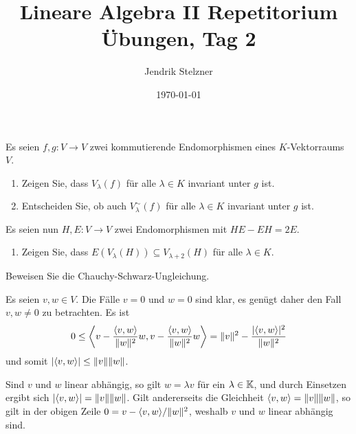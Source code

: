 \documentclass[a4paper, 10pt]{scrartcl}
\title{Lineare Algebra II Repetitorium \\ Übungen, Tag 2}
\author{Jendrik Stelzner}
\date{\today}
\begin{document}
\maketitle


\begin{question}
  Es seien $f, g \colon V \to V$ zwei kommutierende Endomorphismen eines $K$-Vektorraums $V$.
  \begin{enumerate}[leftmargin=*]
    \item
      Zeigen Sie, dass $V_\lambda(f)$ für alle $\lambda \in K$ invariant unter $g$ ist.
    \item
      Entscheiden Sie, ob auch $V^\sim_\lambda(f)$ für alle $\lambda \in K$ invariant unter $g$ ist.
  \end{enumerate}
  Es seien nun $H, E \colon V \to V$ zwei Endomorphismen mit $HE - EH = 2E$.
  \begin{enumerate}[leftmargin=*, resume]
    \item
      Zeigen Sie, dass $E(V_\lambda(H)) \subseteq V_{\lambda + 2}(H)$ für alle $\lambda \in K$.
  \end{enumerate}
\end{question}




\begin{question}
  Beweisen Sie die Chauchy-Schwarz-Ungleichung.
\end{question}


\begin{solution}
  Es seien $v, w \in V$.
  Die Fälle $v = 0$ und $w = 0$ sind klar, es genügt daher den Fall $v, w \neq 0$ zu betrachten.
  Es ist
  \[
          0
    \leq  \left\langle  v - \frac{\left\langle v,w \right\rangle}{\|w\|^2} w, v - \frac{\left\langle v,w \right\rangle}{\|w\|^2} w \right\rangle
    =     \|v\|^2 - \frac{|\langle v,w \rangle|^2}{\|w\|^2}
  \]
  und somit $|\langle v,w \rangle| \leq \|v\| \|w\|$.
  
  Sind $v$ und $w$ linear abhängig, so gilt $w = \lambda v$ für ein $\lambda \in \mathbb{K}$, und durch Einsetzen ergibt sich $|\langle v,w \rangle| = \|v\| \|w\|$.
  Gilt andererseits die Gleichheit $\left\langle v,w \right\rangle = \|v\| \|w\|$, so gilt in der obigen Zeile $0 = v - \langle v,w \rangle/\|w\|^2$, weshalb $v$ und $w$ linear abhängig sind.
\end{solution}
\end{document}
